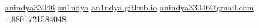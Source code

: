 \documentclass[]{plushcv}
\begin{document}
%
%

{\contactline
{\href{https://www.linkedin.com/in/anindya33046}{\small  anindya33046}}
{\href{https://www.github.com/an1ndya}{\small  an1ndya}}
{\href{https://an1ndya.github.io}{\small  an1ndya.github.io}}
{\href{mailto:anindya33046@gmail.com}{\small anindya33046@gmail.com}}
{\href{tel:+8801721584048}{\small +8801721584048}}}





%
%
\end{document}
